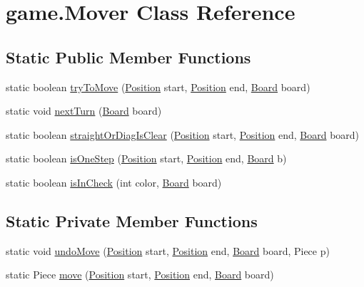 \hypertarget{classgame_1_1_mover}{\section{game.\-Mover Class Reference}
\label{classgame_1_1_mover}
}
\subsection*{Static Public Member Functions}
\begin{DoxyCompactItemize}
\item 
static boolean \hyperlink{classgame_1_1_mover_a659d56fe896ef67c7482e4bbc98b0ca8}{try\-To\-Move} (\hyperlink{classgame_1_1_position}{Position} start, \hyperlink{classgame_1_1_position}{Position} end, \hyperlink{classgame_1_1_board}{Board} board)
\item 
static void \hyperlink{classgame_1_1_mover_aac4f2ed847a535d459f704661c30b4f0}{next\-Turn} (\hyperlink{classgame_1_1_board}{Board} board)
\item 
static boolean \hyperlink{classgame_1_1_mover_a5d5b626da9047ed9c2924a2995f20f4d}{straight\-Or\-Diag\-Is\-Clear} (\hyperlink{classgame_1_1_position}{Position} start, \hyperlink{classgame_1_1_position}{Position} end, \hyperlink{classgame_1_1_board}{Board} board)
\item 
static boolean \hyperlink{classgame_1_1_mover_a125909deeb9fe1319801e2604702c1af}{is\-One\-Step} (\hyperlink{classgame_1_1_position}{Position} start, \hyperlink{classgame_1_1_position}{Position} end, \hyperlink{classgame_1_1_board}{Board} b)
\item 
static boolean \hyperlink{classgame_1_1_mover_acec661da2237784c6b568453a79e8a35}{is\-In\-Check} (int color, \hyperlink{classgame_1_1_board}{Board} board)
\end{DoxyCompactItemize}
\subsection*{Static Private Member Functions}
\begin{DoxyCompactItemize}
\item 
static void \hyperlink{classgame_1_1_mover_aab6015cb025cf194fb0bba8263fbdd45}{undo\-Move} (\hyperlink{classgame_1_1_position}{Position} start, \hyperlink{classgame_1_1_position}{Position} end, \hyperlink{classgame_1_1_board}{Board} board, Piece p)
\item 
static Piece \hyperlink{classgame_1_1_mover_a4f8b699c251b25e227ab084e8d5f8c95}{move} (\hyperlink{classgame_1_1_position}{Position} start, \hyperlink{classgame_1_1_position}{Position} end, \hyperlink{classgame_1_1_board}{Board} board)
\end{DoxyCompactItemize}


